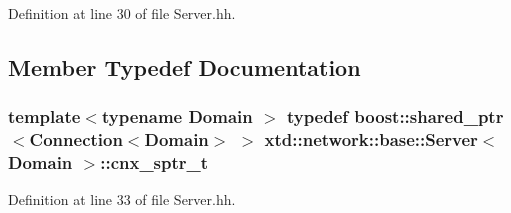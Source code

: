 Definition at line 30 of file Server.\-hh.



\subsection{Member Typedef Documentation}
\hypertarget{classxtd_1_1network_1_1base_1_1Server_aea8c26b2edf1f6c8802db01b3c6b6036}{
\subsubsection[{cnx\-\_\-sptr\-\_\-t}]{\setlength{\rightskip}{0pt plus 5cm}template$<$typename Domain $>$ typedef boost\-::shared\-\_\-ptr$<${\bf Connection}$<$Domain$>$ $>$ {\bf xtd\-::network\-::base\-::\-Server}$<$ Domain $>$\-::{\bf cnx\-\_\-sptr\-\_\-t}\hspace{0.3cm}{\ttfamily [protected]}}}\label{classxtd_1_1network_1_1base_1_1Server_aea8c26b2edf1f6c8802db01b3c6b6036}


Definition at line 33 of file Server.\-hh.



